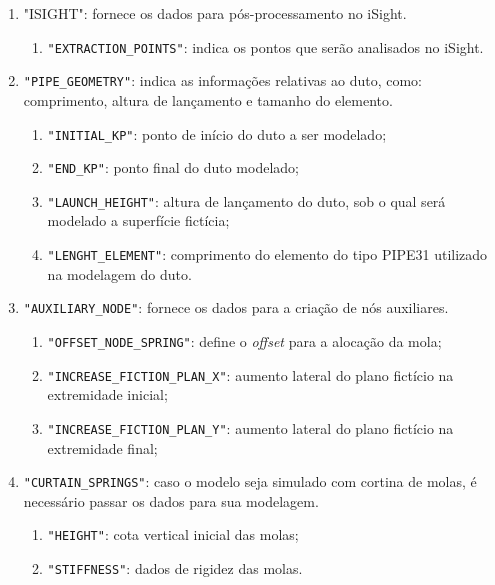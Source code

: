 \begin{enumerate}
    \item "ISIGHT": fornece os dados para pós-processamento no iSight.
        \begin{enumerate}
            \item \texttt{"EXTRACTION\_POINTS"}: indica os pontos que serão analisados no iSight.
        \end{enumerate}
    \item \texttt{"PIPE\_GEOMETRY"}: indica as informações relativas ao duto, como: comprimento, altura de lançamento e tamanho do elemento.
    \begin{enumerate}
        \item \texttt{"INITIAL\_KP"}: ponto de início do duto a ser modelado;
        \item \texttt{"END\_KP"}: ponto final do duto modelado;
        \item \texttt{"LAUNCH\_HEIGHT"}: altura de lançamento do duto, sob o qual será modelado a superfície fictícia;
        \item \texttt{"LENGHT\_ELEMENT"}: comprimento do elemento do tipo PIPE31 utilizado na modelagem do duto.
    \end{enumerate}
    \item \texttt{"AUXILIARY\_NODE"}: fornece os dados para a criação de nós auxiliares.
    \begin{enumerate}
        \item \texttt{"OFFSET\_NODE\_SPRING"}: define o \textit{offset} para a alocação da mola;
        \item \texttt{"INCREASE\_FICTION\_PLAN\_X"}: aumento lateral do plano fictício na extremidade inicial;
        \item \texttt{"INCREASE\_FICTION\_PLAN\_Y"}: aumento lateral do plano fictício na extremidade final;
    \end{enumerate}
    \item \texttt{"CURTAIN\_SPRINGS"}: caso o modelo seja simulado com cortina de molas, é necessário passar os dados para sua modelagem.
    \begin{enumerate}
        \item \texttt{"HEIGHT"}: cota vertical inicial das molas;
        \item \texttt{"STIFFNESS"}: dados de rigidez das molas.
    \end{enumerate}
\end{enumerate}



